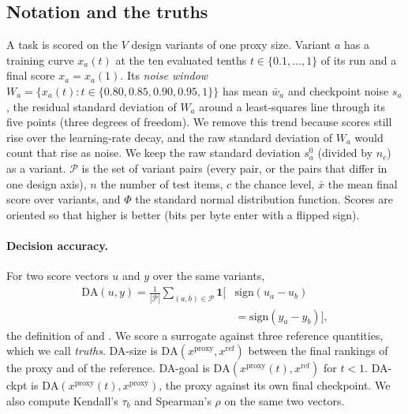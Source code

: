 \subsection{Notation and the truths}
\label{app:sur-notation}

A task is scored on the $V$ design variants of one proxy size.
Variant $a$ has a training curve $x_a(t)$ at the ten evaluated tenths $t \in \{0.1,\dots,1\}$ of its run and a final score $x_a = x_a(1)$. Its \emph{noise window} $W_a = \{x_a(t) : t \in \{0.80, 0.85, 0.90, 0.95, 1\}\}$ has mean $\bar{w}_a$ and checkpoint noise $s_a$, the residual standard deviation of $W_a$ around a least-squares line through its five points (three degrees of freedom). We remove this trend because scores still rise over the learning-rate decay, and the raw standard deviation of $W_a$ would count that rise as noise. We keep the raw standard deviation $s^{0}_a$ (divided by $n_c$) as a variant.
$\mathcal{P}$ is the set of variant pairs (every pair, or the pairs that differ in one design axis), $n$ the number of test items, $c$ the chance level, $\bar{x}$ the mean final score over variants, and $\Phi$ the standard normal distribution function.
Scores are oriented so that higher is better (bits per byte enter with a flipped sign).

\paragraph{Decision accuracy.} For two score vectors $u$ and $y$ over the same variants,
\begin{equation}
\begin{aligned}
\mathrm{DA}(u, y) = \frac{1}{|\mathcal{P}|} \sum_{(a,b) \in \mathcal{P}} \mathbf{1}\big[&\mathrm{sign}(u_a - u_b) \\
&= \mathrm{sign}(y_a - y_b)\big],
\end{aligned}
\label{eq:sur-da}
\end{equation}
the definition of \citet{magnusson_datadecide_2025} and \citet{heineman_signal_2025}.
We score a surrogate against three reference quantities, which we call \emph{truths}. DA-size is $\mathrm{DA}(x^{\text{proxy}}, x^{\text{ref}})$ between the final rankings of the proxy and of the reference. DA-goal is $\mathrm{DA}(x^{\text{proxy}}(t), x^{\text{ref}})$ for $t < 1$. DA-ckpt is $\mathrm{DA}(x^{\text{proxy}}(t), x^{\text{proxy}})$, the proxy against its own final checkpoint.
We also compute Kendall's $\tau_b$ and Spearman's $\rho$ on the same two vectors.

